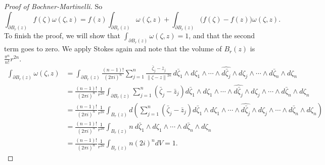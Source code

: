 \documentclass[12pt,openany]{book}
\newcommand{\norm}[1]{\left\lVert {#1} \right\rVert}
\theoremstyle{plain}
\theoremstyle{remark}
\theoremstyle{definition}
\theoremstyle{exercise}
\theoremstyle{example}
\begin{document}
\begin{proof}[Proof of Bochner-Martinelli]
So
\begin{equation*}
\int_{\partial B_r(z)}
f(\zeta) \omega(\zeta,z)
=
f(z)
\int_{\partial B_r(z)}
\omega(\zeta,z)
+
\int_{\partial B_r(z)}
\bigl(f(\zeta)-f(z)\bigr) \omega(\zeta,z) .
\end{equation*}
To finish the proof,
we will show that
$\int_{\partial B_r(z)}
\omega(\zeta,z) = 1$, and that the second term goes to zero.
We apply Stokes again
and note that the volume of $B_r(z)$ is
$\frac{\pi^n}{n!}r^{2n}$.
\begin{equation*}
\begin{split}
\int_{\partial B_r(z)}
\omega(\zeta,z) &=
\int_{\partial B_r(z)}
\frac{(n-1)!}{{(2\pi i)}^n}
\sum_{j=1}^n
\frac{\bar{\zeta}_j-\bar{z}_j}{\norm{\zeta-z}^{2n}} \,
d\bar{\zeta}_1 \wedge d\zeta_1 \wedge
\cdots \wedge
\widehat{ d\bar{\zeta}_j } \wedge d\zeta_j \wedge
\cdots \wedge
d\bar{\zeta}_n \wedge d\zeta_n
\\
&=
\frac{(n-1)!}{{(2\pi i)}^n}\frac{1}{r^{2n}}
\int_{\partial B_r(z)}
\sum_{j=1}^n(\bar{\zeta}_j-\bar{z}_j)
d\bar{\zeta}_1 \wedge d\zeta_1 \wedge
\cdots \wedge
\widehat{ d\bar{\zeta}_j } \wedge d\zeta_j \wedge
\cdots \wedge
d\bar{\zeta}_n \wedge d\zeta_n
\\
&=
\frac{(n-1)!}{{(2\pi i)}^n}\frac{1}{r^{2n}}
\int_{B_r(z)}
d\left(
\sum_{j=1}^n(\bar{\zeta}_j-\bar{z}_j)
d\bar{\zeta}_1 \wedge d\zeta_1 \wedge
\cdots \wedge
\widehat{ d\bar{\zeta}_j } \wedge d\zeta_j \wedge
\cdots \wedge
d\bar{\zeta}_n \wedge d\zeta_n
\right)
\\
&=
\frac{(n-1)!}{{(2\pi i)}^n}\frac{1}{r^{2n}}
\int_{B_r(z)}
n~
d\bar{\zeta}_1 \wedge d\zeta_1 \wedge
\cdots \wedge
d\bar{\zeta}_n \wedge d\zeta_n
\\
&=
\frac{(n-1)!}{{(2\pi i)}^n}\frac{1}{r^{2n}}
\int_{B_r(z)}
n
{(2i)}^n dV
=
1 .
\end{split}
\end{equation*}


\end{proof}
\end{document}
